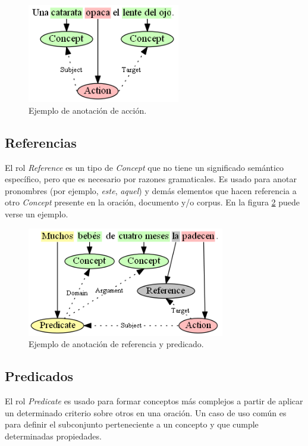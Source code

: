 \begin{figure}[H]
	\begin{center}
		\includegraphics[height=1.7in]{graphics/annotation_example_action.png}
		\caption[Anotación de acción]{Ejemplo de anotación de acción.}
		\label{fig:annotation_example_action}
	\end{center}
\end{figure}

\subsection{Referencias}
El rol \textit{Reference} es un tipo de \textit{Concept} que no tiene un significado semántico específico, pero que es necesario por razones gramaticales. Es usado para anotar pronombres (por ejemplo, \textit{este}, \textit{aquel}) y demás elementos que hacen referencia a otro \textit{Concept} presente en la oración, documento y/o corpus. En la figura \ref{fig:annotation_example_reference_and_predicate} puede verse un ejemplo.

\begin{figure}[H]
	\begin{center}
		\includegraphics[width=3.4in]{graphics/annotation_example_reference_and_predicate.png}
		\caption[Anotación de referencia y predicado]{Ejemplo de anotación de referencia y predicado.}
		\label{fig:annotation_example_reference_and_predicate}
	\end{center}
\end{figure}


\subsection{Predicados}
El rol \textit{Predicate} es usado para formar conceptos más complejos a partir de aplicar un determinado criterio sobre otros en una oración. Un caso de uso común es para definir el subconjunto perteneciente a un concepto y que cumple determinadas propiedades.

